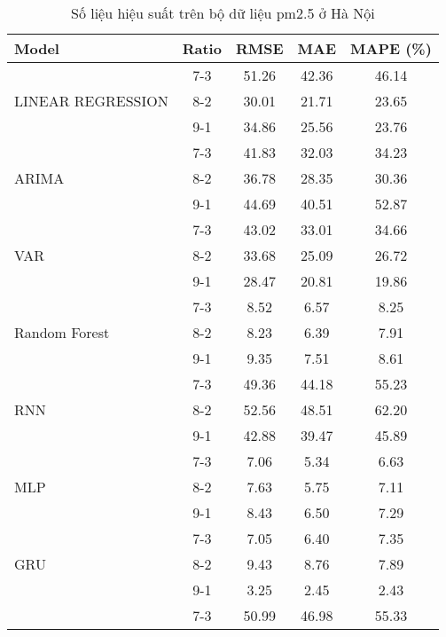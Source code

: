 \begin{table}[h!]
    \centering
    \caption{Số liệu hiệu suất trên bộ dữ liệu pm2.5 ở Hà Nội}
    \begin{tabular}{|l|c|c|c|c|}
    \hline
    \rowcolor{orange!30} \textbf{Model} & \textbf{Ratio} & \textbf{RMSE} & \textbf{MAE} & \textbf{MAPE (\%)} \\ \hline
    \rowcolor{white}  & 7-3 & 51.26 & 42.36 & 46.14 \\ 
    \rowcolor{white}  LINEAR REGRESSION & 8-2 & 30.01 & 21.71 & 23.65 \\ 
    \rowcolor{white}  & 9-1 & 34.86 & 25.56 & 23.76 \\ \hline
    \rowcolor{white}  & 7-3 & 41.83 & 32.03 & 34.23 \\ 
    \rowcolor{white} ARIMA & 8-2 & 36.78 & 28.35 & 30.36 \\ 
    \rowcolor{white}  & 9-1 & 44.69 & 40.51 & 52.87 \\ \hline
    \rowcolor{white}  & 7-3 & 43.02 & 33.01 & 34.66 \\ 
    \rowcolor{white} VAR & 8-2 & 33.68 & 25.09 & 26.72 \\ 
    \rowcolor{white}  & 9-1 & 28.47 & 20.81 & 19.86 \\ \hline
    \rowcolor{white} & 7-3 & 8.52 & 6.57 & 8.25 \\ 
    \rowcolor{white} Random Forest & 8-2 & 8.23 & 6.39 & 7.91 \\ 
    \rowcolor{white} & 9-1 & 9.35 & 7.51 & 8.61 \\ \hline
    \rowcolor{white}  & 7-3 & 49.36 & 44.18 & 55.23 \\ 
    \rowcolor{white} RNN & 8-2 & 52.56 & 48.51 & 62.20 \\
    \rowcolor{white}  & 9-1 & 42.88 & 39.47 & 45.89 \\ \hline
    \rowcolor{white}  & 7-3 & 7.06 & 5.34 & 6.63 \\
    \rowcolor{white}  MLP & 8-2 & 7.63 & 5.75 & 7.11  \\ 
    \rowcolor{white}  & 9-1 & 8.43 & 6.50 & 7.29 \\ \hline
    \rowcolor{white}  & 7-3 & 7.05 & 6.40 & 7.35 \\ 
    \rowcolor{white} GRU & 8-2 & 9.43 & 8.76 & 7.89  \\ 
    \rowcolor{white}  & 9-1 & 3.25 & 2.45 & 2.43 \\ \hline
    \rowcolor{white}  & 7-3 & 50.99 & 46.98 & 55.33 \\ 

\end{tabular}
\end{table}
